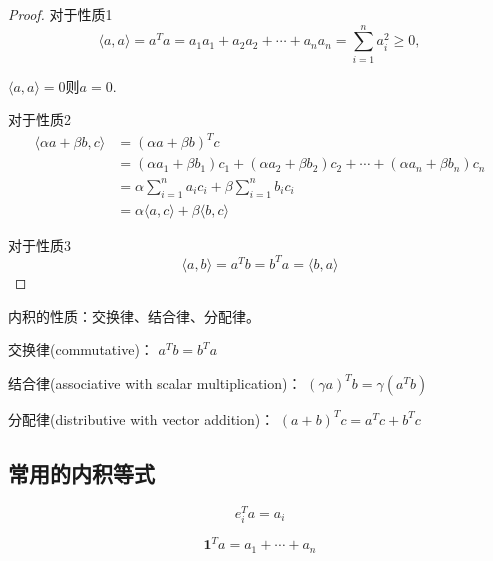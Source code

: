 \begin{proof}
对于性质1
    \begin{equation}\langle a, a\rangle=a^T a=a_{1} a_{1}+a_{2} a_{2}+\cdots+a_{n} a_{n}=\sum_{i=1}^{n} a_{i}^{2} \geq 0,\end{equation}

    $\langle a, a\rangle=0 则 a=0$.

    对于性质2
    \begin{equation}\begin{aligned} \langle\alpha a+\beta {b}, {c}\rangle 
    & = (\alpha a+\beta {b})^T c 
    \\ &=\left(\alpha a_{1}+\beta b_{1}\right) c_{1}+\left(\alpha a_{2}+\beta b_{2}\right) c_{2}+\cdots+\left(\alpha a_{n}+\beta b_{n}\right) c_{n} 
    \\ &=\alpha \sum_{i=1}^{n} a_{i} c_{i}+\beta \sum_{i=1}^{n} b_{i} c_{i}
    \\ &=\alpha\langle a, c\rangle+\beta\langle b, c\rangle\end{aligned} \end{equation}

    对于性质3
    \begin{equation} \langle a, b\rangle=a^{{T}} b=b^{{T}} a=\langle b, a\rangle \end{equation}
\end{proof}

\begin{theorem}
    内积的性质：交换律、结合律、分配律。 

交换律(commutative)： $  a^{T} b=b^{T} a  $

结合律(associative with scalar multiplication)： $  (\gamma a)^{T} b=\gamma\left(a^{T} b\right)  $

分配律(distributive with vector addition)： $  (a+b)^{T} c=a^{T} c+b^{T} c  $
\end{theorem}


\subsection{常用的内积等式}
\begin{corollary}[选出第$i$项]
    \begin{equation} e_{i}^{T} a=a_{i} \end{equation}
\end{corollary}

\begin{corollary}[向量每一项之和]
    \begin{equation} \mathbf{1}^{T} a=a_{1}+\cdots+a_{n} \end{equation}
\end{corollary}

